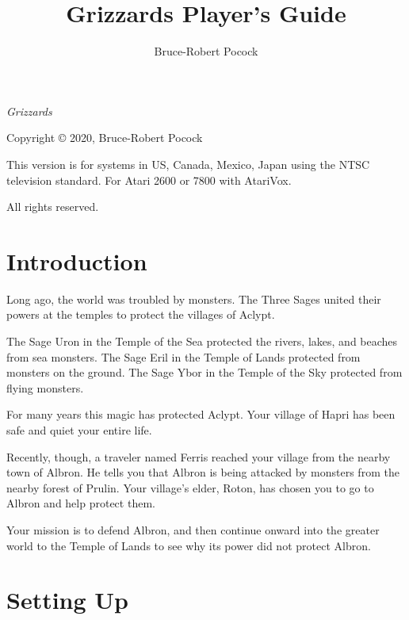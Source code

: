 \documentclass[10pt,twoside,openright]{memoir}
\title{Grizzards Player's Guide}
\author{Bruce-Robert Pocock}
\makeatletter
\newcommand\TV{NTSC}
\newcommand\REGION{US, Canada, Mexico, Japan}
\newcommand\TV{PAL}
\newcommand\REGION{Europe (except France)}
\newcommand\TV{SECAM}
\newcommand\REGION{France, Russia, Africa}
\def\maketitle{%
  \null
  \thispagestyle{empty}%
  \vfill
  \begin{center}\leavevmode
    \normalfont
    {\LARGE\raggedleft \@author\par}%
    \hrulefill\par
    {\huge\raggedright \@title\par}%
    \vskip 1cm
  \end{center}%
  \vfill
  \null
  \cleardoublepage
  }
\makeatother
\begin{document}
\let\cleardoublepage\clearpage


\maketitle

\frontmatter

\null\vfill

\begin{flushleft}
\textit{Grizzards}


Copyright © 2020, Bruce-Robert Pocock

This version is for systems in \REGION{} using the \TV{} television
standard. For Atari 2600 or 7800 with AtariVox.




\thedate

\bigskip

All rights reserved.

\end{flushleft}
\let\cleardoublepage\clearpage

\mainmatter

\chapter{Introduction}

Long ago,  the world was  troubled by  monsters. The Three  Sages united
their powers at the temples to protect the villages of Aclypt.

The Sage Uron in the Temple of  the Sea protected the rivers, lakes, and
beaches  from  sea monsters.  The  Sage  Eril  in  the Temple  of  Lands
protected from  monsters on the ground.  The Sage Ybor in  the Temple of
the Sky protected from flying monsters.

For many  years this magic has  protected Aclypt. Your village  of Hapri
has been safe and quiet your entire life.

Recently, though, a traveler named  Ferris reached your village from the
nearby town  of Albron. He  tells you that  Albron is being  attacked by
monsters from the nearby forest  of Prulin. Your village's elder, Roton,
has chosen you to go to Albron and help protect them.

Your mission  is to  defend Albron,  and then  continue onward  into the
greater  world to  the Temple  of Lands  to see  why its  power did  not
protect Albron.

\chapter{Setting Up}
\end{document}
